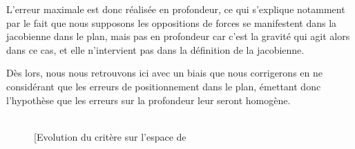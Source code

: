L'erreur maximale est donc r\'ealis\'ee en profondeur, ce qui s'explique 
notamment par le fait que nous supposons les oppositions de forces se 
manifestent dans la jacobienne dans le plan, mais pas en profondeur car c'est la 
gravit\'e qui agit alors dans ce cas, et elle n'intervient pas dans la 
d\'efinition de la jacobienne.

D\`es lors, nous nous retrouvons ici avec un biais que nous corrigerons en ne 
consid\'erant que les erreurs de positionnement dans le plan, \'emettant donc 
l'hypoth\`ese que les erreurs sur la profondeur leur seront homog\`ene.

\begin{figure}[!htp]
  \centering
  \centering
\hfill
     \\
\hfill
    \subfloat[Evolution du crit\`ere sur l'espace de 

\end{figure}
